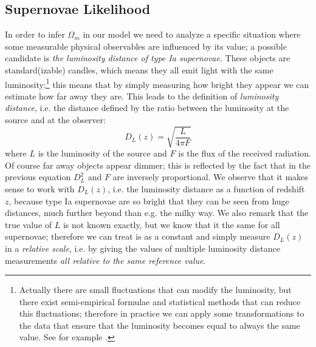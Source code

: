 \subsection{Supernovae Likelihood}
In order to infer $\Omega_m$ in our model we need to analyze a specific situation where some measurable physical observables are influenced by its value; a possible candidate is \emph{the luminosity distance of type Ia supernovae}.
These objects are standard(izable) candles, which means they all emit light with the same luminosity;\footnote{Actually there are small fluctuations that can modify the luminosity, but there exist semi-empirical formulae and statistical methods that can reduce this fluctuations; therefore in practice we can apply some transformations to the data that ensure that the luminosity becomes equal to always the same value. See for example \cite{supernovae_bhm}.} this means that by simply measuring how bright they appear we can estimate how far away they are.
This leads to the definition of \emph{luminosity distance}, i.e. the distance defined by the ratio between the luminosity at the source and at the observer:
\begin{equation*}
    D_L(z) = \sqrt{\frac{L}{4\pi F}}
\end{equation*}
where $L$ is the luminosity of the source and $F$ is the flux of the received radiation. Of course far away objects appear dimmer; this is reflected by the fact that in the previous equation $D_L^2$ and $F$ are inversely proportional.
We observe that it makes sense to work with $D_L(z)$, i.e. the luminosity distance as a function of redshift $z$, because type Ia supernovae are so bright that they can be seen from huge distances, much further beyond than e.g. the milky way.
We also remark that the true value of $L$ is not known exactly, but we know that it the same for all supernovae; therefore we can treat is as a constant and simply measure $D_L(z)$ in a \emph{relative scale}, i.e. by giving the values of multiple luminosity distance measurements \emph{all relative to the same reference value}.

